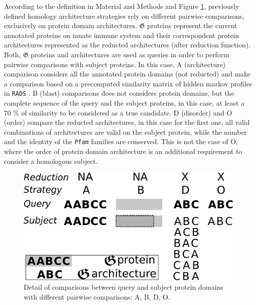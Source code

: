 \documentclass[11pt]{article}
\newcommand{\TODO}[1]{\begingroup\color{red}#1\endgroup}
\begin{document}
According to the definition in Material and Methods and Figure \ref{fig:ABDO}, 
previously defined homology architecture strategies rely on different pairwise 
comparisons, exclusively on protein domain architectures. $\boldsymbol{\mathfrak{G}}$
proteins represent the current annotated proteins on innate immune system and 
their correspondent protein architectures represented as the reducted architectures
(after reduction function). Both, $\boldsymbol{\mathfrak{G}}$ proteins and 
architectures are used as queries in order to perform pairwise comparisons with
subject proteins. In this case, A (architecture) comparison considers all the
annotated protein domains (not reducted) and make a comparison based on a precomputed 
similarity matrix of \TODO{hidden markov profiles} in \texttt{RADS} \cite{}.   
B (blast) comparisons does not considers protein domains, but the complete sequence
of the query and the subject proteins, in this case, at least a $70$ \% of similarity 
to be considered as a true candidate. D (disorder) and O (order) compare the 
reducted architectures, in this case for the first one, all valid combinations of 
architectures are valid on the subject protein, while the number and the identity of
the \texttt{Pfam} families are conserved. This is not the case of O, where the order
of protein domain architecture is an additional requirement to consider a homologous
subject. 

\begin{figure}[ht!]
\centering
\includegraphics[scale=0.3]{figures/ABDO}%
\caption{Detail of comparisons between query and subject protein domains with 
	different pairwise comparisons: A, B, D, O.}
\label{fig:ABDO}
\end{figure}
\end{document}
